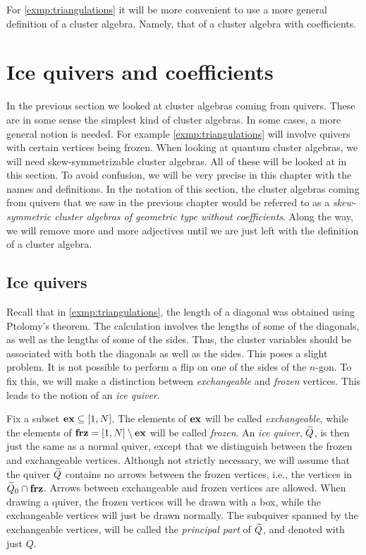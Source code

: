 For \cref{exmp:triangulations} it will be more convenient to use a more general
definition of a cluster algebra. Namely, that of a cluster algebra with coefficients.

\section{Ice quivers and coefficients}\label{sec:ice_quivers_and_coefficients}

In the previous section we looked at cluster algebras coming from quivers. These are in
some sense the simplest kind of cluster algebras. In some cases, a more general notion
is needed. For example \cref{exmp:triangulations} will involve quivers with certain
vertices being frozen. When looking at quantum cluster algebras, we will need
skew-symmetrizable cluster algebras. All of these will be looked at in this section. To
avoid confusion, we will be very precise in this chapter with the names and
definitions. In the notation of this section, the cluster algebras coming from quivers
that we saw in the previous chapter would be referred to as a \emph{skew-symmetric
	cluster algebras of geometric type without coefficients}. Along the way, we will remove
more and more adjectives until we are just left with the definition of a cluster
algebra.

\subsection{Ice quivers}

Recall that in \cref{exmp:triangulations}, the length of a diagonal was obtained using
Ptolomy's theorem. The calculation involves the lengths of some of the diagonals, as
well as the lengths of some of the sides. Thus, the cluster variables should be
associated with both the diagonals as well as the sides. This poses a slight problem.
It is not possible to perform a flip on one of the sides of the $n$-gon. To fix this,
we will make a distinction between \emph{exchangeable} and \emph{frozen} vertices. This
leads to the notion of an \emph{ice quiver}.

Fix a subset $\mathbf{ex} \subseteq [1, N]$. The elements of $\mathbf{ex}$ will be called
\emph{exchangeable}, while the elements of $\mathbf{frz} = [1, N] \setminus
	\mathbf{ex}$ will be called \emph{frozen}. An \emph{ice quiver}, $\widetilde{Q}$, is then
just the same as a normal quiver, except that we distinguish between the frozen and
exchangeable vertices. Although not strictly necessary, we will assume that the quiver
$\widetilde{Q}$ contains no arrows between the frozen vertices, i.e., the vertices in $\widetilde{Q}_0 \cap
	\mathbf{frz}$. Arrows between exchangeable and frozen vertices are allowed. When drawing a
quiver, the frozen vertices will be drawn with a box, while the exchangeable vertices
will just be drawn normally. The subquiver spanned by the exchangeable vertices, will
be called the \emph{principal part} of $\widetilde{Q}$, and
denoted with just $Q$.

